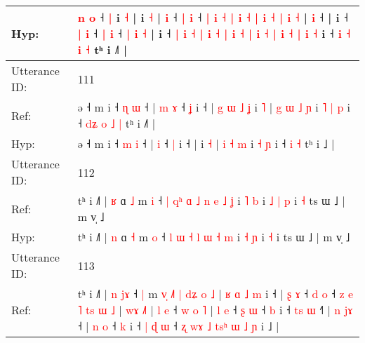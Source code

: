 \documentclass[10pt]{article}
\DeclareRobustCommand{\hl}[1]{{\textcolor{red}{#1}}}
\begin{document}
\begin{longtable}{ll}
 \\
Hyp: & \hl{n} \hl{o} ˧ \hl{|} i \hl{˧} |\hl{}\hl{}\hl{}\hl{}\hl{}\hl{}\hl{}\hl{} i \hl{˧} |\hl{}\hl{}\hl{}\hl{}\hl{}\hl{}\hl{}\hl{}\hl{} \hl{i} ˧\hl{}\hl{}\hl{}\hl{}\hl{} \hl{}\hl{}\hl{|} \hl{i} ˧ \hl{|} \hl{i} \hl{˧} \hl{|} \hl{}\hl{i} \hl{˧} \hl{}\hl{}\hl{|} \hl{i} \hl{˧} \hl{}\hl{|} \hl{i} \hl{˧} |\hl{}\hl{} \hl{}\hl{i} ˧ |\hl{}\hl{}\hl{} i ˧ \hl{|} \hl{}\hl{i} ˧ \hl{|} \hl{}\hl{i} ˧ \hl{|} \hl{i} \hl{˧} |\hl{}\hl{} i\hl{} ˧\hl{}\hl{}\hl{}\hl{} \hl{|} \hl{i} \hl{˧} \hl{|} \hl{i} \hl{}\hl{˧} \hl{|} \hl{i} \hl{}\hl{˧} \hl{|} \hl{i} \hl{}\hl{˧} \hl{|} \hl{i} \hl{˧} \hl{|} \hl{i} \hl{˧} i ˧ \hl{}\hl{i} \hl{˧} \hl{i} \hl{˧} tʰ i ˩˥ |
 \\
\midrule
Utterance ID: & 111 \\
Ref: & ə ˧ m i ˧ \hl{ɳ} \hl{ɯ} ˧ |\hl{ }\hl{m} \hl{ɤ} ˧ \hl{ʝ} i ˧ |\hl{ }\hl{g}\hl{ }\hl{ɯ}\hl{ }\hl{˩}\hl{ }\hl{ʝ} i \hl{˥} |\hl{ }\hl{g} \hl{ɯ} \hl{˩} \hl{ɲ} i\hl{ }\hl{˥} \hl{|} \hl{p} i ˧\hl{ }\hl{d}\hl{ʑ}\hl{ }\hl{o} \hl{˩} \hl{|} tʰ i ˩\hl{˥} |
 \\
Hyp: & ə ˧ m i ˧ \hl{m} \hl{i} ˧ |\hl{}\hl{} \hl{i} ˧ \hl{|} i ˧ |\hl{}\hl{}\hl{}\hl{}\hl{}\hl{}\hl{}\hl{} i \hl{˧} |\hl{}\hl{} \hl{i} \hl{˧} \hl{m} i\hl{}\hl{} \hl{˧} \hl{ɲ} i ˧\hl{}\hl{}\hl{}\hl{}\hl{} \hl{i} \hl{˧} tʰ i ˩\hl{} |
 \\
\midrule
Utterance ID: & 112 \\
Ref: & tʰ i ˩˥ | \hl{ʁ} ɑ \hl{˩} m \hl{i} ˧\hl{ }\hl{|} \hl{q}\hl{ʰ} \hl{ɑ} \hl{˩} \hl{n} \hl{e} \hl{˩} \hl{ʝ} i \hl{˥} \hl{b} i\hl{ }\hl{˩}\hl{ }\hl{|} \hl{p} i\hl{ }\hl{˧} ts ɯ ˩ | m v̩ ˩
 \\
Hyp: & tʰ i ˩˥ | \hl{n} ɑ \hl{˧} m \hl{o} ˧\hl{}\hl{} \hl{}\hl{l} \hl{ɯ} \hl{˧} \hl{l} \hl{ɯ} \hl{˧} \hl{m} i \hl{˧} \hl{ɲ} i\hl{}\hl{}\hl{}\hl{} \hl{˧} i\hl{}\hl{} ts ɯ ˩ | m v̩ ˩
 \\
\midrule
Utterance ID: & 113 \\
Ref: & tʰ i ˩˥ |\hl{ }\hl{n} \hl{j}\hl{ɤ} ˧\hl{ }\hl{|} m\hl{ }\hl{v}\hl{̩} \hl{˩}\hl{˥} \hl{|} \hl{d}\hl{ʑ} \hl{o} \hl{˩} |\hl{ }\hl{ʁ}\hl{ }\hl{ɑ}\hl{ }\hl{˩}\hl{ }\hl{m} i ˧ |\hl{ }\hl{ʂ} \hl{ɤ} ˧ \hl{d} \hl{o} ˧\hl{ }\hl{z}\hl{ }\hl{e}\hl{ }\hl{˥}\hl{ }\hl{t}\hl{s}\hl{ }\hl{ɯ}\hl{ }\hl{˩} | \hl{w}\hl{ɤ} \hl{˩}\hl{˥} |\hl{ }\hl{l} \hl{e} ˧ \hl{w} \hl{o} \hl{˥} |\hl{ }\hl{l} \hl{e} ˧ \hl{ʂ} \hl{ɯ} ˧ \hl{b} i ˧ \hl{t}\hl{s} \hl{ɯ} ˧\hl{˥} |\hl{ }\hl{n} \hl{j}\hl{ɤ} ˧ |\hl{ }\hl{n} \hl{o} ˧ \hl{k} i ˧\hl{ }\hl{|} \hl{ɖ} \hl{ɯ} ˧ \hl{ʐ} \hl{w}\hl{ɤ} \hl{˩} \hl{t}\hl{s}\hl{ʰ} \hl{ɯ} \hl{˩}\hl{ }\hl{ɲ} i ˩ |
 \\

\end{longtable}
\end{document}
